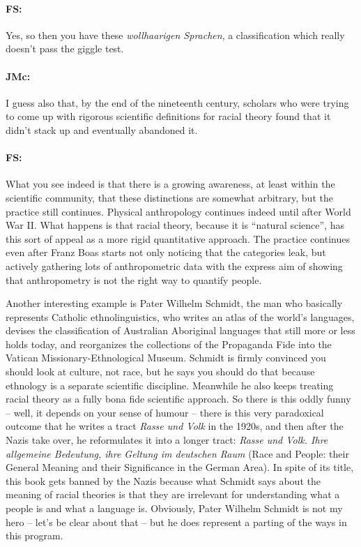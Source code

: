 \documentclass[output=paper]{langscibook}
\begin{document}
\paragraph*{FS:}  Yes, so then you have these %
\textit{wollhaarigen Sprachen}, a classification which really doesn’t pass the giggle test.


\paragraph*{JMc:}   I guess also that, by the end of the nineteenth century, scholars who were trying to come up with rigorous scientific definitions for racial theory found that it didn’t stack up and eventually abandoned it.


\paragraph*{FS:}  What you see indeed is that there is a growing awareness, at least within the scientific community, that these distinctions are somewhat arbitrary, but the practice still continues. Physical anthropology continues indeed until after World War II. What happens is that racial theory, because it is “natural science”, has this sort of appeal as a more rigid quantitative approach. The practice continues even after Franz Boas starts not only noticing that the categories leak, but actively gathering lots of anthropometric data with the express aim of showing that anthropometry is not the right way to quantify people.

Another interesting example is Pater Wilhelm Schmidt, the man who basically represents Catholic ethnolinguistics, who writes an atlas of the world’s languages, devises the classification of Australian Aboriginal languages that still more or less holds today, and reorganizes the collections of the Propaganda Fide into the Vatican Missionary-Ethnological Museum. Schmidt is firmly convinced you should look at culture, not race, but he says you should do that because ethnology is a separate scientific discipline. Meanwhile he also keeps treating racial theory as a fully bona fide scientific approach. So there is this oddly funny – well, it depends on your sense of humour – there is this very paradoxical outcome that he writes a tract \textit{Rasse und Volk} in the 1920s, and then after the Nazis take over, he reformulates it into a longer tract: \textit{Rasse und Volk. Ihre allgemeine Bedeutung, ihre Geltung im deutschen Raum} (Race and People: their General Meaning and their Significance in the German Area). In spite of its title, this book gets banned by the Nazis because what Schmidt says about the meaning of racial theories is that they are irrelevant for understanding what a people is and what a language is. Obviously, Pater Wilhelm Schmidt is not my hero – let’s be clear about that – but he does represent a parting of the ways in this program.
\end{document}
